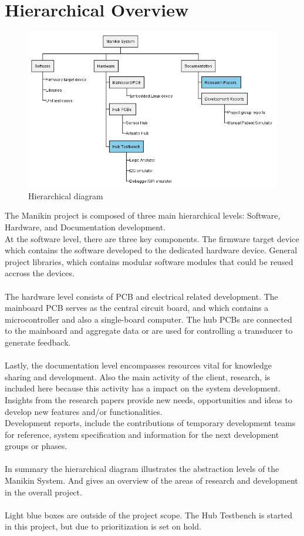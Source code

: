 \section{Hierarchical Overview}
\begin{figure}[h!]
  \includegraphics[scale=0.60]{figures/Hierarchial_Diagram.png}
  \caption{Hierarchical diagram}
\end{figure}
The Manikin project is composed of three main hierarchical levels: Software, Hardware, and Documentation development.\\
At the software level, there are three key components. The firmware target device which contains the software developed to the dedicated hardware device. General project libraries, which contains modular software modules that could be reused accross the devices.\\\\
The hardware level consists of PCB and electrical related development. The mainboard PCB serves as the central circuit board, and which contains a microcontroller and also a single-board computer. The hub PCBs are connected to the mainboard and aggregate data or are used for controlling a transducer to generate feedback. \\\\
Lastly, the documentation level encompasses resources vital for knowledge sharing and development. Also the main activity of the client, research, is included here because this activity has a impact on the system development. Insights from the research papers provide new needs, opportunities and ideas to develop new features and/or functionalities. \\ 
Development reports, include the contributions of temporary development teams for reference, system specification and information for the next development groups or phases.\\\\
In summary the hierarchical diagram illustrates the abstraction levels of the Manikin System. And gives an overview of the areas of research and development in the overall project.\\\\
Light blue boxes are outside of the project scope. The Hub Testbench is started in this project, but due to prioritization is set on hold. 
